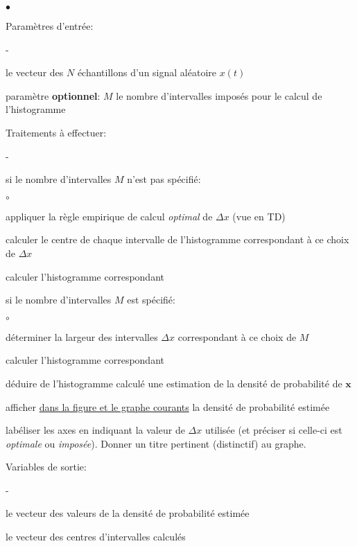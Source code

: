 \documentclass{article}
\begin{document}
\begin{list}{$\bullet$}{\setlength{\leftmargin}{3mm} \setlength{\labelwidth}{20mm} \setlength{\labelsep}{2mm} \setlength{\itemsep}{1mm} }
\item Paramètres d'entrée:
\begin{list}{-}{\setlength{\leftmargin}{3mm} \setlength{\labelwidth}{20mm} \setlength{\labelsep}{2mm} \setlength{\itemsep}{1mm} }
\item le vecteur des $N$ échantillons d'un signal aléatoire $x(t)$
\item paramètre \textbf{optionnel}: $M$ le nombre d'intervalles imposés pour le calcul de l'histogramme
\end{list}
\item Traitements à effectuer:
\begin{list}{-}{\setlength{\leftmargin}{3mm} \setlength{\labelwidth}{20mm} \setlength{\labelsep}{2mm} \setlength{\itemsep}{1mm} }
\item si le nombre d'intervalles $M$ n'est pas spécifié:
\begin{list}{$\circ$}{\setlength{\leftmargin}{3mm} \setlength{\labelwidth}{20mm} \setlength{\labelsep}{2mm} \setlength{\itemsep}{1mm} }
\item appliquer la règle empirique de calcul {\em optimal} de $\Delta x$ (vue en TD)
\item calculer le centre de chaque intervalle de l'histogramme correspondant à ce choix de $\Delta x$
\item calculer l'histogramme correspondant
\end{list}
\item si le nombre d'intervalles $M$ est spécifié:
\begin{list}{$\circ$}{\setlength{\leftmargin}{3mm} \setlength{\labelwidth}{20mm} \setlength{\labelsep}{2mm} \setlength{\itemsep}{1mm} }
\item déterminer la largeur des intervalles $\Delta x$ correspondant à ce choix de $M$
\item calculer l'histogramme correspondant
\end{list}
\item déduire de l'histogramme calculé une estimation de la densité de probabilité de $\mathbf{x}$
\item afficher \underline{dans la figure et le graphe courants} la densité de probabilité estimée
\item labéliser les axes en indiquant la valeur de $\Delta x$ utilisée (et préciser si celle-ci est {\em optimale} ou {\em imposée}). Donner un titre pertinent (distinctif) au graphe.
\end{list}
\item Variables de sortie:
\begin{list}{-}{\setlength{\leftmargin}{3mm} \setlength{\labelwidth}{20mm} \setlength{\labelsep}{2mm} \setlength{\itemsep}{1mm} }
\item le vecteur des valeurs de la densité de probabilité estimée
\item le vecteur des centres d'intervalles calculés
\end{list}
\end{list}
\end{document}
